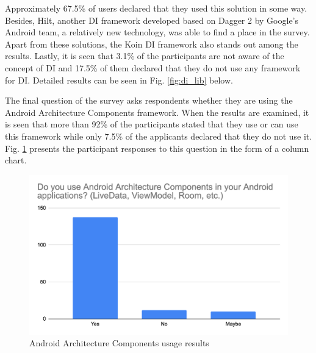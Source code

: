 Approximately 67.5\% of users declared that they used this solution in some way. Besides, Hilt, another DI framework developed based on Dagger 2 by Google's Android team, a relatively new technology, was able to find a place in the survey. Apart from these solutions, the Koin DI framework also stands out among the results. Lastly, it is seen that 3.1\% of the participants are not aware of the concept of DI and 17.5\% of them declared that they do not use any framework for DI. Detailed results can be seen in Fig. \ref{fig:di_lib} below.

The final question of the survey asks respondents whether they are using the Android Architecture Components framework. When the results are examined, it is seen that more than 92\% of the participants stated that they use or can use this framework while only 7.5\% of the applicants declared that they do not use it. Fig. \ref{fig:arch_components} presents the participant responses to this question in the form of a column chart.
\begin{figure}[ht!]
    \centering
    \includegraphics[scale=0.27]{figures/arch_components.png}
    \caption{Android Architecture Components usage results}
    \label{fig:arch_components}
\end{figure}
\FloatBarrier